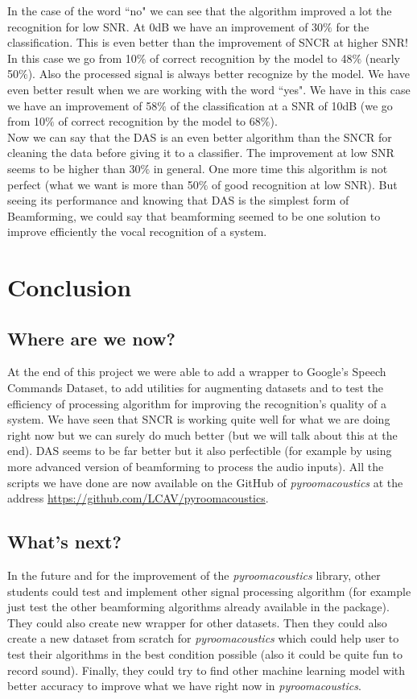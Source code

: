 \documentclass[11pt,a4paper,titlepage]{report}
\begin{document}
In the case of the word ``no" we can see that the algorithm improved a lot the recognition for low SNR. At 0dB we have an improvement of 30$\%$ for the classification. This is even better than the improvement of SNCR at higher SNR! In this case we go from 10$\%$ of correct recognition by the model to 48$\%$ (nearly 50$\%$). Also the processed signal is always better recognize by the model. We have even better result when we are working with the word ``yes". We have in this case we have an improvement of 58$\%$ of the classification at a SNR of 10dB (we go from 10$\%$ of correct recognition by the model to 68$\%$).\\
Now we can say that the DAS is an even better algorithm than the SNCR for cleaning the data before giving it to a classifier. The improvement at low SNR seems to be higher than 30$\%$ in general. One more time this algorithm is not perfect (what we want is more than 50$\%$ of good recognition at low SNR). But seeing its performance and knowing that DAS is the simplest form of Beamforming, we could say that beamforming seemed to be one solution to improve efficiently the vocal recognition of a system.
\chapter{Conclusion}
\section{Where are we now?}
\hspace*{0.6cm}
At the end of this project we were able to add a wrapper to Google's Speech Commands Dataset, to add utilities for augmenting  datasets and to test the efficiency of processing algorithm for improving the recognition's quality of a system. We have seen that SNCR is working quite well for what we are doing right now but we can surely do much better (but we will talk about this at the end). DAS seems to be far better but it also perfectible (for example by using more advanced version of beamforming to process the audio inputs).
All the scripts we have done are now available on the GitHub of \textit{pyroomacoustics} at the address \url{https://github.com/LCAV/pyroomacoustics}. 

\section{What's next?}
In the future and for the improvement of the \textit{pyroomacoustics} library, other students could test and implement other signal processing algorithm (for example just test the other beamforming algorithms already available in the package). They could also create new wrapper for other datasets. Then they could also create a new dataset from scratch for \textit{pyroomacoustics} which could help user to test their algorithms in the best condition possible (also it could be quite fun to record sound). Finally, they could try to find other machine learning model with better accuracy to improve what we have right now in \textit{pyroomacoustics}.
\end{document}
